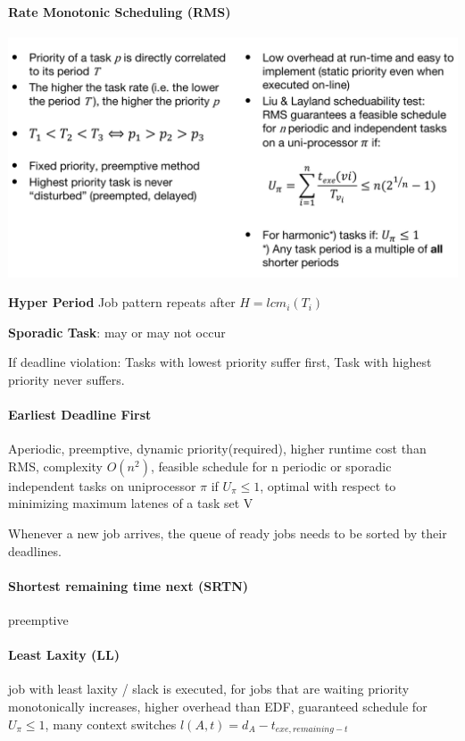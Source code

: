 \documentclass[english]{latex4ei/latex4ei_sheet}
\begin{document}
\paragraph{Rate Monotonic Scheduling (RMS)}

\begin{center}
  \centering
  \includegraphics[width=\linewidth]{assets/RateMonotonicScheduling.png}
  \label{fig:ratemonotonicscheduling}
\end{center}

\textbf{Hyper Period} Job pattern repeats after $H = lcm_i(T_i)$

\textbf{Sporadic Task}: may or may not occur

If deadline violation: Tasks with lowest priority suffer first, Task with highest priority never suffers.

\paragraph{Earliest Deadline First}
Aperiodic, preemptive, dynamic priority(required), higher runtime cost than RMS, complexity $O(n^2)$, feasible schedule for n periodic or sporadic independent tasks on uniprocessor $\pi$ if $U_{\pi} \leq 1$, optimal with respect to minimizing maximum latenes of a task set V

Whenever a new job arrives, the queue of ready jobs needs to be sorted by their deadlines.

\paragraph{Shortest remaining time next (SRTN)}
preemptive

\paragraph{Least Laxity (LL)} job with least laxity / slack is executed, for jobs that are waiting priority monotonically increases, higher overhead than EDF, guaranteed schedule for $U_{\pi} \leq 1$, many context switches $l(A,t) = d_A - t_{exe, remaining - t}$
\end{document}
